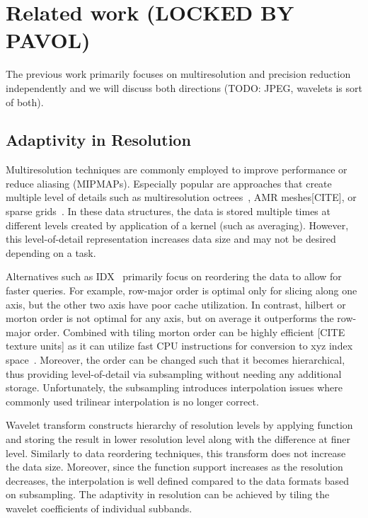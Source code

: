 \section{Related work (LOCKED BY PAVOL)}

The previous work primarily focuses on multiresolution and precision
reduction independently and we will discuss both directions
(TODO: JPEG, wavelets is sort of both).


\subsection{Adaptivity in Resolution}
Multiresolution techniques are commonly employed to improve performance or
reduce aliasing (MIPMAPs). Especially popular are approaches that create
multiple level of details such as multiresolution octrees~\cite{multires_octree1999},
AMR meshes[CITE], or sparse grids~\cite{vdb2013, spgrid2014}. In these data structures,
the data is stored multiple times at different levels created by application of a kernel
(such as averaging). However, this level-of-detail representation increases data size
and may not be desired depending on a task.

Alternatives such as IDX~\cite{idx2001} primarily focus on reordering the data to allow
for faster queries. For example, row-major order is optimal only for slicing
along one axis, but the other two axis have poor cache utilization. In contrast, hilbert
or morton order is not optimal for any axis, but on average it outperforms the row-major
order. Combined with tiling morton order can be highly efficient [CITE texture units] as
it can utilize fast CPU instructions for conversion to xyz index space~\cite{spgrid2014}.
Moreover, the order can be changed such that it becomes hierarchical, thus providing
level-of-detail via subsampling without needing any additional storage. Unfortunately,
the subsampling introduces interpolation issues where commonly used trilinear interpolation
is no longer correct.

Wavelet transform constructs hierarchy of resolution levels by applying function and storing
the result in lower resolution level along with the difference at finer level. Similarly to
data reordering techniques, this transform does not increase the data size. Moreover, since
the function support increases as the resolution decreases, the interpolation is well defined
compared to the data formats based on subsampling. The adaptivity in resolution can be achieved
by tiling the wavelet coefficients of individual subbands.

